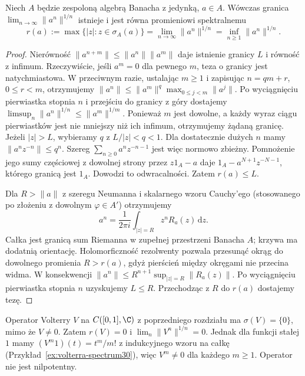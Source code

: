 \begin{twierdzenie}
\label{thm:spectral-radius31}
Niech $A$ będzie zespoloną algebrą Banacha z jedynką, $a\in A$.
Wówczas granica $\lim_{n\to\infty}\|a^n\|^{1/n}$ istnieje
i jest równa promieniowi spektralnemu
\[
 r(a):=\max\{|z|:z\in\sigma_A(a)\}
 =\lim_{n\to\infty}\|a^n\|^{1/n}
 =\inf_{n\ge1}\|a^n\|^{1/n}.
\]
\end{twierdzenie}
\begin{proof}
Nierówność $\|a^{n+m}\|\le\|a^n\|\|a^m\|$ daje istnienie granicy
$L$ i równość z infimum. Rzeczywiście, jeśli $a^m=0$ dla
pewnego $m$, teza o granicy jest natychmiastowa.
W przeciwnym razie, ustalając $m\ge1$ i zapisując $n=qm+r$,
$0\le r<m$, otrzymujemy
$\|a^n\|\le\|a^m\|^q\max_{0\le j<m}\|a^j\|$.
Po wyciągnięciu pierwiastka stopnia $n$ i przejściu do granicy
z góry dostajemy
$\limsup_n\|a^n\|^{1/n}\le\|a^m\|^{1/m}$.
Ponieważ $m$ jest dowolne, a każdy wyraz ciągu pierwiastków
jest nie mniejszy niż ich infimum, otrzymujemy żądaną granicę.
Jeżeli $|z|>L$, wybieramy $q$ z $L/|z|<q<1$.
Dla dostatecznie dużych $n$ mamy $\|a^n z^{-n}\|\le q^n$.
Szereg $\sum_{n\ge0}a^n z^{-n-1}$ jest więc normowo
zbieżny. Pomnożenie jego sumy częściowej z dowolnej strony
przez $z1_A-a$ daje $1_A-a^{N+1}z^{-N-1}$,
którego granicą jest $1_A$. Dowodzi to odwracalności.
Zatem $r(a)\le L$.

Dla $R>\|a\|$ z szeregu Neumanna i skalarnego wzoru Cauchy'ego
(stosowanego po złożeniu z dowolnym $\varphi\in A'$) otrzymujemy
\[
 a^n=\frac{1}{2\pi i}\int_{|z|=R}z^nR_a(z)\,\mathrm dz.
\]
Całka jest granicą sum Riemanna w zupełnej przestrzeni Banacha $A$;
krzywa ma dodatnią orientację. Holomorficzność rezolwenty pozwala
przesunąć okrąg do dowolnego promienia $R>r(a)$, gdyż pierścień
między okręgami nie przecina widma. W konsekwencji
$\|a^n\|\le R^{n+1}\sup_{|z|=R}\|R_a(z)\|$.
Po wyciągnięciu pierwiastka stopnia $n$ uzyskujemy $L\le R$.
Przechodząc z $R$ do $r(a)$ dostajemy tezę.
\end{proof}

\begin{przyklad}
Operator Volterry $V$ na $C([0,1],\C)$ z
poprzedniego rozdziału ma $\sigma(V)=\{0\}$,
mimo że $V\ne0$. Zatem $r(V)=0$ i
$\lim_n\|V^n\|^{1/n}=0$. Jednak dla funkcji stałej $1$ mamy
$(V^m1)(t)=t^m/m!$ z indukcyjnego wzoru na całkę
(Przykład~\ref{ex:volterra-spectrum30}), więc $V^m\ne0$
dla każdego $m\ge1$. Operator nie jest nilpotentny.
\end{przyklad}

